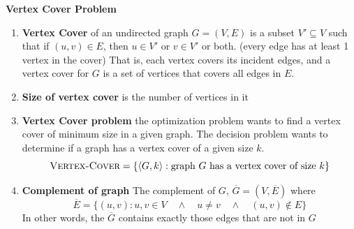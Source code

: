 \documentclass[11pt]{article}
\begin{document}
\begin{defn*}
    \textbf{Vertex Cover Problem}
    \begin{enumerate}
        \item \textbf{Vertex Cover} of an undirected graph $G = (V,E)$ is a subset $V' \subseteq V$ such that if $(u,v)\in E$, then $u\in V'$ or $v\in V'$ or both. (every edge has at least 1 vertex in the cover) That is, each vertex covers its incident edges, and a vertex cover for $G$ is a set of vertices that covers all edges in $E$.
        \item \textbf{Size of vertex cover} is the number of vertices in it 
        \item \textbf{Vertex Cover problem} the optimization problem wants to find a vertex cover of minimum size in a given graph. The decision problem wants to determine if a graph has a vertex cover of a given size $k$. 
        \[
            \textsc{Vertex-Cover} = \{\langle G, k\rangle : \text{graph $G$ has a vertex cover of size $k$} \}
        \]
        \item \textbf{Complement of graph} The complement of $G$, $\overline{G} = (V,\overline{E})$ where 
        \[
            \overline{E} = \{ (u,v) : u,v\in V \quad \land \quad u\neq v \quad \land \quad (u,v)\not\in E \}
        \]
        In other words, the $\overline{G}$ contains exactly those edges that are not in $G$
    \end{enumerate}
\end{defn*}
\end{document}

